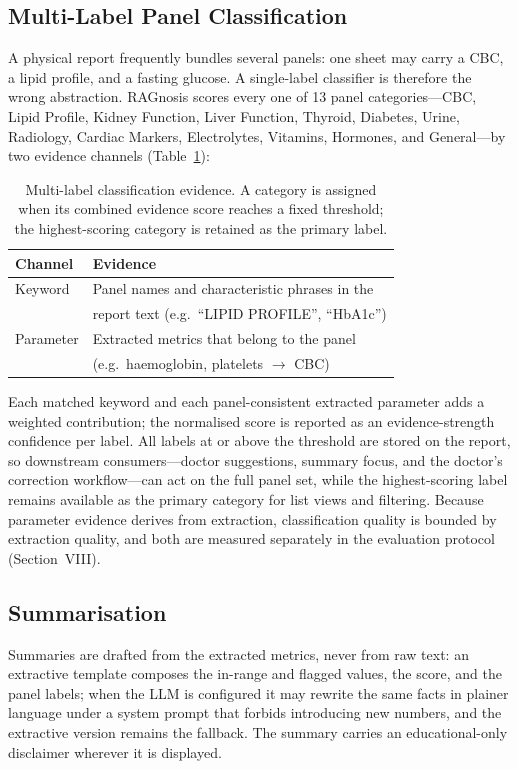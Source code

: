 \documentclass[conference]{IEEEtran}
\begin{document}
\subsection{Multi-Label Panel Classification}
A physical report frequently bundles several panels: one sheet may
carry a CBC, a lipid profile, and a fasting glucose. A single-label
classifier is therefore the wrong abstraction. RAGnosis scores every
one of 13 panel categories---CBC, Lipid Profile, Kidney Function,
Liver Function, Thyroid, Diabetes, Urine, Radiology, Cardiac Markers,
Electrolytes, Vitamins, Hormones, and General---by two evidence
channels (Table~\ref{tab:classify}):

\begin{table}[t]
\centering
\small
\caption{Multi-label classification evidence. A category is assigned
when its combined evidence score reaches a fixed threshold; the
highest-scoring category is retained as the primary label.}
\label{tab:classify}
\begin{tabular}{@{}ll@{}}
\toprule
\textbf{Channel} & \textbf{Evidence} \\
\midrule
Keyword & Panel names and characteristic phrases in the \\
        & report text (e.g.\ ``LIPID PROFILE'', ``HbA1c'') \\
Parameter & Extracted metrics that belong to the panel \\
        & (e.g.\ haemoglobin, platelets $\rightarrow$ CBC) \\
\bottomrule
\end{tabular}
\end{table}

Each matched keyword and each panel-consistent extracted parameter adds
a weighted contribution; the normalised score is reported as an
evidence-strength confidence per label. All labels at or above the
threshold are stored on the report, so downstream consumers---doctor
suggestions, summary focus, and the doctor's correction workflow---can act
on the full panel set, while the highest-scoring label remains
available as the primary category for list views and filtering. Because
parameter evidence derives from extraction, classification quality is
bounded by extraction quality, and both are measured separately in the
evaluation protocol (Section~VIII).

\subsection{Summarisation}
Summaries are drafted from the extracted metrics, never from raw text:
an extractive template composes the in-range and flagged values, the
score, and the panel labels; when the LLM is configured it may rewrite
the same facts in plainer language under a system prompt that forbids
introducing new numbers, and the extractive version remains the
fallback. The summary carries an educational-only disclaimer wherever
it is displayed.
\end{document}
